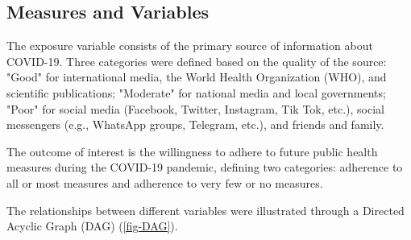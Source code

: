 \documentclass[11pt]{article} %
\begin{document}
\subsection{Measures and Variables}  
The exposure variable consists of the primary source of information about COVID-19. Three categories were defined based on the quality of the source: "Good" for international media, the World Health Organization (WHO), and scientific publications; "Moderate" for national media and local governments; "Poor" for social media (Facebook, Twitter, Instagram, Tik Tok, etc.), social messengers (e.g., WhatsApp groups, Telegram, etc.), and friends and family.

The outcome of interest is the willingness to adhere to future public health measures during the COVID-19 pandemic, defining two categories: adherence to all or most measures and adherence to very few or no measures.

The relationships between different variables were illustrated through a Directed Acyclic Graph (DAG) (\cref{fig-DAG}). 
\end{document}
